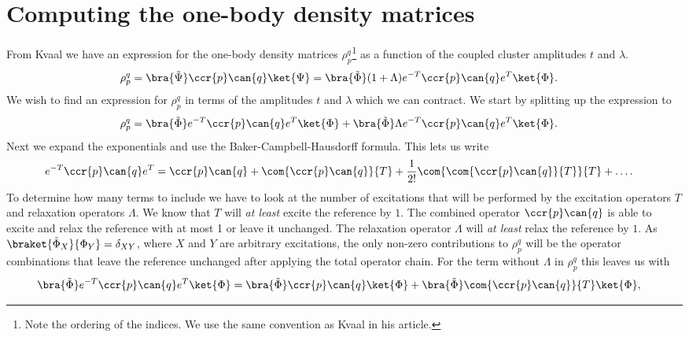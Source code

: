 \chapter{Computing the one-body density matrices}
    From Kvaal\cite{kvaal2012ab} we have an expression for the one-body density
    matrices $\rho^q_p$\footnote{Note the ordering of the indices. We use the
    same convention as Kvaal in his article.} as a function of the coupled
    cluster amplitudes $t$ and $\lambda$.
    \begin{align}
        \rho^{q}_{p}
        &= \bra{\tilde{\Psi}}\ccr{p}\can{q}\ket{\Psi}
        = \bra{\tilde{\Phi}}(1 + \Lambda)e^{-T}\ccr{p}\can{q}e^T\ket{\Phi}.
    \end{align}
    We wish to find an expression for $\rho^{q}_{p}$ in terms of the amplitudes
    $t$ and $\lambda$ which we can contract. We start by splitting up the
    expression to
    \begin{align}
        \rho^q_p
        &= \bra{\tilde{\Phi}}e^{-T}\ccr{p}\can{q}e^T\ket{\Phi}
        + \bra{\tilde{\Phi}}\Lambda e^{-T}\ccr{p}\can{q}e^T\ket{\Phi}.
    \end{align}
    Next we expand the exponentials and use the Baker-Campbell-Hausdorff
    formula. This lets us write
    \begin{align}
        e^{-T}\ccr{p}\can{q}e^T
        &= \ccr{p}\can{q}
        + \com{\ccr{p}\can{q}}{T}
        + \frac{1}{2!}\com{\com{\ccr{p}\can{q}}{T}}{T}
        + \dots.
    \end{align}
    To determine how many terms to include we have to look at the number of
    excitations that will be performed by the excitation operators $T$ and
    relaxation operators $\Lambda$. We know that $T$ will \textit{at least}
    excite the reference by $1$. The combined operator $\ccr{p}\can{q}$ is able
    to excite and relax the reference with at most 1 or leave it unchanged. The
    relaxation operator $\Lambda$ will \textit{at least} relax the reference by
    $1$. As $\braket{\tilde{\Phi}_X}{\Phi_Y} = \delta_{XY}$, where $X$ and $Y$
    are arbitrary excitations, the only non-zero contributions to $\rho^q_p$
    will be the operator combinations that leave the reference unchanged after
    applying the total operator chain. For the term without $\Lambda$ in
    $\rho^q_p$ this leaves us with
    \begin{align}
        \bra{\tilde{\Phi}}e^{-T}\ccr{p}\can{q}e^T\ket{\Phi}
        &= \bra{\tilde{\Phi}}\ccr{p}\can{q}\ket{\Phi}
        + \bra{\tilde{\Phi}}\com{\ccr{p}\can{q}}{T}\ket{\Phi},
    \end{align}
